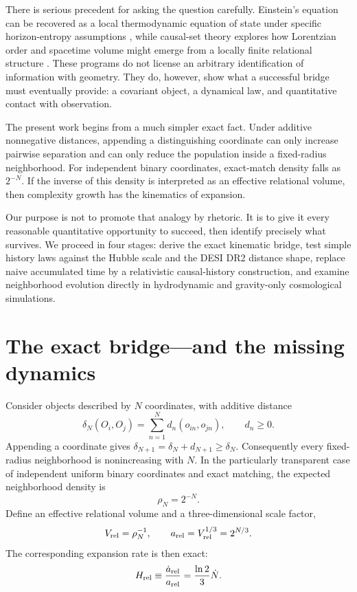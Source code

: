 \documentclass[10pt,twocolumn]{article}
\begin{document}
There is serious precedent for asking the question carefully.  Einstein's
equation can be recovered as a local thermodynamic equation of state under
specific horizon-entropy assumptions \citep{Jacobson1995}, while causal-set
theory explores how Lorentzian order and spacetime volume might emerge from a
locally finite relational structure \citep{Surya2019}.  These programs do not
license an arbitrary identification of information with geometry.  They do,
however, show what a successful bridge must eventually provide: a covariant
object, a dynamical law, and quantitative contact with observation.

The present work begins from a much simpler exact fact.  Under additive
nonnegative distances, appending a distinguishing coordinate can only increase
pairwise separation and can only reduce the population inside a fixed-radius
neighborhood.  For independent binary coordinates, exact-match density falls
as $2^{-N}$.  If the inverse of this density is interpreted as an effective
relational volume, then complexity growth has the kinematics of expansion.

Our purpose is not to promote that analogy by rhetoric.  It is to give it every
reasonable quantitative opportunity to succeed, then identify precisely what
survives.  We proceed in four stages: derive the exact kinematic bridge, test
simple history laws against the Hubble scale and the DESI DR2 distance shape,
replace naive accumulated time by a relativistic causal-history construction,
and examine neighborhood evolution directly in hydrodynamic and gravity-only
cosmological simulations.

\section{The exact bridge---and the missing dynamics}

Consider objects described by $N$ coordinates, with additive distance
\begin{equation}
 \delta_N(O_i,O_j)=\sum_{n=1}^{N}d_n(o_{in},o_{jn}),
 \qquad d_n\geq0.
\end{equation}
Appending a coordinate gives
$\delta_{N+1}=\delta_N+d_{N+1}\geq\delta_N$.  Consequently every
fixed-radius neighborhood is nonincreasing with $N$.  In the particularly
transparent case of independent uniform binary coordinates and exact matching,
the expected neighborhood density is
\begin{equation}
 \rho_N=2^{-N}.
\end{equation}
Define an effective relational volume and a three-dimensional scale factor,
\begin{equation}
 V_{\rm rel}=\rho_N^{-1},\qquad
 a_{\rm rel}=V_{\rm rel}^{1/3}=2^{N/3}.
\end{equation}
The corresponding expansion rate is then exact:
\begin{equation}
 H_{\rm rel}\equiv\frac{\dot a_{\rm rel}}{a_{\rm rel}}
 =\frac{\ln2}{3}\dot N.
 \label{eq:bridge}
\end{equation}
\end{document}
